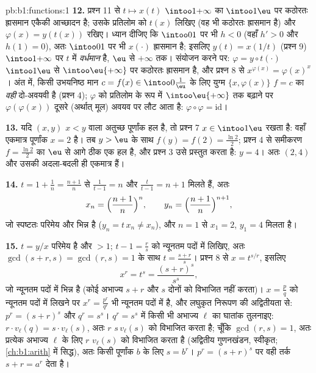 \begin{solution}{pb:b1:functions:1}
\textbf{12.} प्रश्न 11 से $t \mapsto x(t)$ $\intoo1{+\infty}$ का
$\intoo1\eu$ पर कठोरतः ह्रासमान एकैकी आच्छादन है; उसके प्रतिलोम को $t(x)$
लिखिए (वह भी कठोरतः ह्रासमान है) और $\varphi(x) = y(t(x))$ रखिए। ध्यान दीजिए
कि $\intoo01$ पर भी $h < 0$ (वहाँ $h' > 0$ और $h(1) = 0$), अतः $\intoo01$ पर
भी $x(\cdot)$ ह्रासमान है; इसलिए $y(t) = x(1/t)$ (प्रश्न 9)
$\intoo1{+\infty}$ पर $t$ में \emph{वर्धमान} है, $\eu$ से $+\infty$ तक।
संयोजन करने पर: $\varphi = y \circ t(\cdot)$ $\intoo1\eu$ से
$\intoo\eu{+\infty}$ पर कठोरतः ह्रासमान है, और प्रश्न 8 से $x^{\varphi(x)} =
\varphi(x)^x$। अंत में, किसी उभयनिष्ठ मान $c = f(x) \in \intoo0{\frac1\eu}$
के लिए युग्म $\{x, \varphi(x)\}$ $f = c$ का \emph{वही} दो-अवयवी 
है (प्रश्न 4); $\varphi$ को प्रतिलोम  के रूप में
$\intoo\eu{+\infty}$ तक बढ़ाने पर $\varphi(\varphi(x))$ दूसरे (अर्थात् मूल)
अवयव पर लौट आता है: $\varphi \circ \varphi = \mathrm{id}$।

\textbf{13.} यदि $(x, y)$ $x < y$ वाला अतुच्छ पूर्णांक हल है, तो प्रश्न 7 $x
\in \intoo1\eu$ रखता है: वहाँ एकमात्र पूर्णांक $x = 2$ है। तब $y > \eu$ के
साथ $f(y) = f(2) = \frac{\ln2}2$; प्रश्न 4 से समीकरण $f = \frac{\ln2}2$ का
$\eu$ से आगे ठीक एक हल है, और प्रश्न 3 उसे प्रस्तुत करता है: $y = 4$। अतः
$(2, 4)$ और उसकी अदला-बदली ही एकमात्र हैं।

\textbf{14.} $t = 1 + \frac1n = \frac{n+1}n$ से $\frac1{t - 1} = n$ और
$\frac t{t-1} = n + 1$ मिलते हैं, अतः
\[
x_n = \Bigl(\frac{n+1}n\Bigr)^{n},
\qquad
y_n = \Bigl(\frac{n+1}n\Bigr)^{n+1},
\]
जो स्पष्टतः परिमेय और भिन्न है ($y_n = t\,x_n \neq x_n$), और $n = 1$ से $x_1
= 2$, $y_1 = 4$ मिलता है।

\textbf{15.} $t = y/x$ परिमेय है और $> 1$; $t - 1 = \frac rs$ को न्यूनतम
पदों में लिखिए, अतः $\gcd(s + r, s) = \gcd(r, s) = 1$ के साथ $t = \frac{s +
r}s$। प्रश्न 8 से $x = t^{s/r}$, इसलिए
\[
x^r = t^s = \frac{(s+r)^s}{s^s} ,
\]
जो न्यूनतम पदों में भिन्न है (कोई अभाज्य $s + r$ और $s$ दोनों को विभाजित
नहीं करता)। $x = \frac pq$ को न्यूनतम पदों में लिखने पर $x^r = \frac{p^r}
{q^r}$ भी न्यूनतम पदों में है, और लघुकृत निरूपण की अद्वितीयता से: $p^r =
(s+r)^s$ और $q^r = s^s$। $q^r = s^s$ में किसी भी अभाज्य $\ell$ का घातांक
तुलनाइए: $r \cdot v_\ell(q) = s \cdot v_\ell(s)$, अतः $r$ $s\,v_\ell(s)$ को
विभाजित करता है; चूँकि $\gcd(r, s) = 1$, अतः प्रत्येक अभाज्य $\ell$ के लिए
$r$ $v_\ell(s)$ को विभाजित करता है (अद्वितीय गुणनखंडन, स्वीकृत;
\cref{ch:b1:arith} में सिद्ध), अतः किसी पूर्णांक $b$ के लिए $s = b^r$। $p^r
= (s+r)^s$ पर वही तर्क $s + r = a^r$ देता है।


\end{solution}
